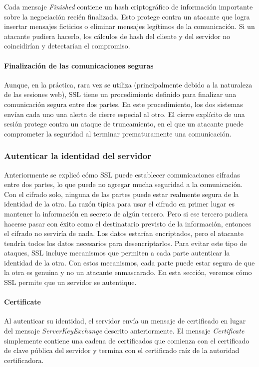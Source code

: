 Cada mensaje \emph{Finished} contiene un hash criptográfico de información 
importante sobre la negociación recién finalizada. Esto protege contra 
un atacante que logra insertar mensajes ficticios o eliminar mensajes 
legítimos de la comunicación. Si un atacante pudiera hacerlo, los 
cálculos de hash del cliente y del servidor no coincidirían y detectarían 
el compromiso.

\paragraph*{Finalización de las comunicaciones seguras}

Aunque, en la práctica, rara vez se utiliza (principalmente debido a la 
naturaleza de las sesiones web), SSL tiene un procedimiento definido para 
finalizar una comunicación segura entre dos partes. En este procedimiento, 
los dos sistemas envían cada uno una alerta de cierre especial al otro. 
El cierre explícito de una sesión protege contra un ataque de truncamiento,
en el que un atacante puede comprometer la seguridad al terminar 
prematuramente una comunicación.

\subsubsection*{Autenticar la identidad del servidor}
Anteriormente se explicó cómo SSL puede establecer comunicaciones 
cifradas entre dos partes, lo que puede no agregar mucha seguridad a 
la comunicación. Con el cifrado solo, ninguna de las partes puede 
estar realmente segura de la identidad de la otra. La razón típica 
para usar el cifrado en primer lugar es mantener la información en 
secreto de algún tercero. Pero si ese tercero pudiera hacerse pasar 
con éxito como el destinatario previsto de la información, entonces el 
cifrado no serviría de nada. Los datos estarían encriptados, pero el 
atacante tendría todos los datos necesarios para desencriptarlos. Para 
evitar este tipo de ataques, SSL incluye mecanismos que permiten a cada 
parte autenticar la identidad de la otra. Con estos mecanismos, cada 
parte puede estar segura de que la otra es genuina y no un atacante 
enmascarado. En esta sección, veremos cómo SSL permite que un servidor 
se autentique.

\paragraph*{Certificate}
Al autenticar su identidad, el servidor envía un mensaje de certificado 
en lugar del mensaje \emph{ServerKeyExchange} descrito anteriormente. El mensaje 
\emph{Certificate} simplemente contiene una cadena de certificados que comienza 
con el certificado de clave pública del servidor y termina con el certificado 
raíz de la autoridad certificadora.

